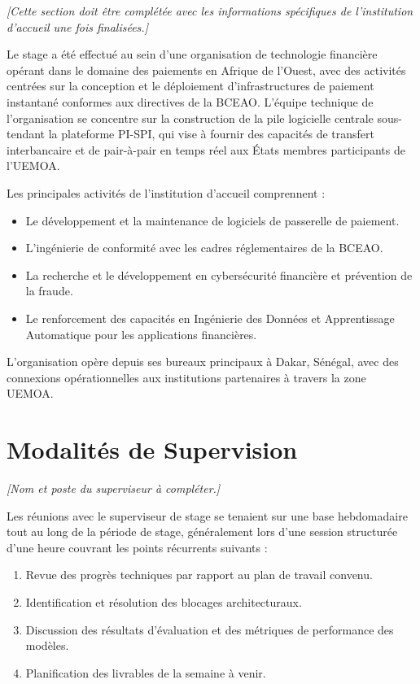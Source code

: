 \documentclass[12pt,a4paper,oneside]{book}
\theoremstyle{definition}
\theoremstyle{plain}
\begin{document}
\noindent\textit{[Cette section doit être complétée avec les informations spécifiques de l'institution d'accueil une fois finalisées.]}

Le stage a été effectué au sein d'une organisation de technologie financière opérant dans le domaine des paiements en Afrique de l'Ouest, avec des activités centrées sur la conception et le déploiement d'infrastructures de paiement instantané conformes aux directives de la BCEAO. L'équipe technique de l'organisation se concentre sur la construction de la pile logicielle centrale sous-tendant la plateforme PI-SPI, qui vise à fournir des capacités de transfert interbancaire et de pair-à-pair en temps réel aux États membres participants de l'UEMOA.

Les principales activités de l'institution d'accueil comprennent :
\begin{itemize}
  \item Le développement et la maintenance de logiciels de passerelle de paiement.
  \item L'ingénierie de conformité avec les cadres réglementaires de la BCEAO.
  \item La recherche et le développement en cybersécurité financière et prévention de la fraude.
  \item Le renforcement des capacités en Ingénierie des Données et Apprentissage Automatique pour les applications financières.
\end{itemize}

L'organisation opère depuis ses bureaux principaux à Dakar, Sénégal, avec des connexions opérationnelles aux institutions partenaires à travers la zone UEMOA.

\section{Modalités de Supervision}

\noindent\textit{[Nom et poste du superviseur à compléter.]}

Les réunions avec le superviseur de stage se tenaient sur une base hebdomadaire tout au long de la période de stage, généralement lors d'une session structurée d'une heure couvrant les points récurrents suivants :

\begin{enumerate}
  \item Revue des progrès techniques par rapport au plan de travail convenu.
  \item Identification et résolution des blocages architecturaux.
  \item Discussion des résultats d'évaluation et des métriques de performance des modèles.
  \item Planification des livrables de la semaine à venir.
\end{enumerate}
\end{document}
